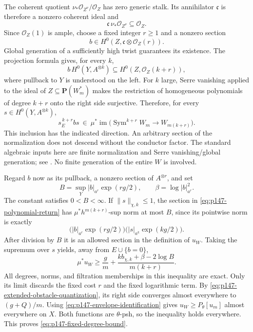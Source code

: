 The coherent quotient
\(\nu_*\mathcal O_{Z^\nu}/\mathcal O_Z\) has zero generic stalk.
Its annihilator \(\mathfrak c\) is therefore a nonzero coherent ideal and
\[
              \mathfrak c\,\nu_*\mathcal O_{Z^\nu}\subseteq\mathcal O_Z.
\]
Since \(\mathcal O_Z(1)\) is ample, choose a fixed integer \(r\geq1\) and
a nonzero section
\[
                  b\in H^0(Z,\mathfrak c\otimes\mathcal O_Z(r)).
\]
Global generation of a sufficiently high twist guarantees its existence.
The projection formula gives, for every \(k\),
\begin{equation}\label{eq:p147-conductor-inclusion}
 b\,H^0(Y,A^{\otimes k})
                    \subseteq H^0(Z,\mathcal O_Z(k+r)),
\end{equation}
where pullback to \(Y\) is understood on the left.
For \(k\) large, Serre vanishing applied to the ideal of
\(Z\subseteq\mathbf P(W_m^*)\) makes the restriction of homogeneous
polynomials of degree \(k+r\) onto the right side surjective.
Therefore, for every \(s\in H^0(Y,A^{\otimes k})\),
\begin{equation}\label{eq:p147-polynomial-return}
                 s_E^{\,k+r}bs
          \ \in\ \mu^*\operatorname{im}
                    \bigl(\operatorname{Sym}^{k+r}W_m
                                      \longrightarrow W_{m(k+r)}\bigr).
\end{equation}
This inclusion has the indicated direction.  An arbitrary section of the
normalization does not descend without the conductor factor.
The standard algebraic inputs here are finite normalization and Serre
vanishing/global generation; see \cite{StacksNormalization,StacksSerre}.
No finite generation of the entire \(W\) is involved.

Regard \(b\) now as its pullback, a nonzero section of \(A^{\otimes r}\), and
set
\[
 B=\sup_Y |b|_{a^r}\exp(rg/2),\qquad
 \beta=\log|b|_{a^r}^2.
\]
The constant satisfies \(0<B<\infty\).
If \(\|s\|_{\chi,k}\leq1\), the section in
\eqref{eq:p147-polynomial-return} has \(\mu^*h^{m(k+r)}\)-sup norm at most
\(B\), since its pointwise norm is exactly
\[
       \bigl(|b|_{a^r}\exp(rg/2)\bigr)
       \bigl(|s|_{a^k}\exp(kg/2)\bigr).
\]
After division by \(B\) it is an allowed section in the definition of
\(u_W\).  Taking the supremum over \(s\) yields, away from \(E\cup\{b=0\}\),
\begin{equation}\label{eq:p147-pointwise-return}
 \mu^*u_W\geq
       \frac{g}{m}
       +\frac{k b_{\chi,k}+\beta-2\log B}{m(k+r)} .
\end{equation}
All degrees, norms, and filtration memberships in this inequality are
exact.  Only its limit discards the fixed cost \(r\) and the fixed
logarithmic term.
By \eqref{eq:p147-extended-obstacle-quantization}, its right side converges
almost everywhere to \((g+Q)/m\).
Using \eqref{eq:p147-envelope-identification} gives
\(u_W\geq P_\theta[u_m]\) almost everywhere on \(X\).
Both functions are \(\theta\)-psh, so the inequality holds everywhere.
This proves \eqref{eq:p147-fixed-degree-bound}.

